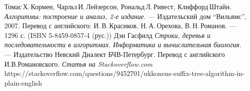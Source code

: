 \begin{thebibliography}{99}
Томас\,Х.\,Кормен, Чарльз\,И.\,Лейзерсон, Рональд\,Л.\,Ривест, Клиффорд\,Штайн.
{\itshape Алгоритмы: построение и анализ, 2-е издание.} --- Издательский дом \enquote{Вильямс}, 2007. Перевод с английского: И.\,В.\,Красиков, Н.\,А.\,Орехова, В.\,Н.\,Романов. --- 1296 с. (ISBN 5-8459-0857-4 (рус.))
Дэн Гасфилд
{\itshape Строки, деревья и последовательности в алгоритмах. Информатика и вычислительная биология.} --- Издательство
Невский Диалект БЧВ-Петербург. Перевод с английского И.В.Романовского.
{\itshape Статья на Stackoverflow.com}  https://stackoverflow.com/questions/9452701/ukkonens-suffix-tree-algorithm-in-plain-english
\end{thebibliography}

\pagebreak

